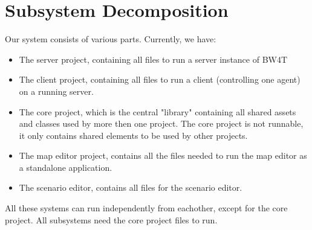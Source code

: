 \section{Subsystem Decomposition}

Our system consists of various parts. Currently, we have:
\begin{itemize}
\item
The server project, containing all files to run a server instance of BW4T
\item
The client project, containing all files to run a client (controlling one agent) on a running server. 
\item
The core project, which is the central "library" containing all shared assets and classes used by more then one project. The core project is not runnable, it only contains shared elements to be used by other projects. 
\item
The map editor project, contains all the files needed to run the map editor as a standalone application.
\item
The scenario editor, contains all files for the scenario editor.
\end{itemize}

All these systems can run independently from eachother, except for the core project. All subsystems need the core project files to run. \\
